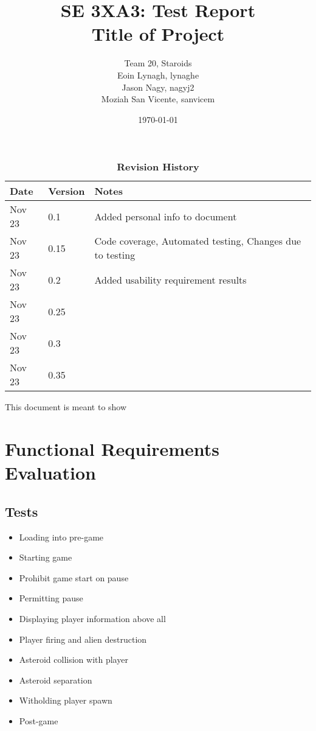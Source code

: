 \documentclass[12pt, titlepage]{article}
\title{SE 3XA3: Test Report\\Title of Project}
\author{Team 20, Staroids
		\\ Eoin Lynagh, lynaghe
		\\ Jason Nagy, nagyj2
		\\ Moziah San Vicente, sanvicem
}
\date{\today}
\begin{document}
\maketitle

\tableofcontents
\listoftables
\listoffigures

\begin{table}[bp]
\caption{\bf Revision History}
\begin{tabularx}{\textwidth}{p{3cm}p{2cm}X}
\toprule {\bf Date} & {\bf Version} & {\bf Notes}\\
\midrule
Nov 23 & 0.1 & Added personal info to document\\
Nov 23 & 0.15 & Code coverage, Automated testing, Changes due to testing\\
Nov 23 & 0.2 & Added usability requirement results\\
Nov 23 & 0.25 & \\
Nov 23 & 0.3 & \\
Nov 23 & 0.35 & \\
\bottomrule
\end{tabularx}
\end{table}

\newpage


This document is meant to show \\

\section{Functional Requirements Evaluation}
\subsection{Tests}
\begin{itemize}
  \item{Loading into pre-game\\}
  \item{Starting game\\}
  \item{Prohibit game start on pause\\}
  \item{Permitting pause\\}
  \item{Displaying player information above all\\}
  \item{Player firing and alien destruction\\}
  \item{Asteroid collision with player\\}
  \item{Asteroid separation\\}
  \item{Witholding player spawn\\}
  \item{Post-game\\}
\end{itemize}
\end{document}
